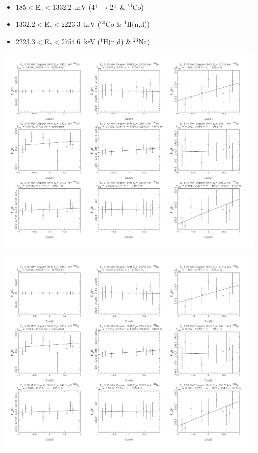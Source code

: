 \begin{itemize}
\item 185$<$E$_\gamma<$1332.2~keV (4$^+\rightarrow$2$^+$ \& $^{60}$Co)
\item 1332.2$<$E$_\gamma<$2223.3~keV ($^{60}$Co \& $^1$H(n,d))
\item 2223.3$<$E$_\gamma<$2754.6~keV ($^1$H(n,d) \& $^{23}$Na)
\end{itemize}
\newpage
\begin{center}
\includegraphics[page=1,angle=90,height=0.95\textheight]{162Dy_ftau_310_LE_n.pdf}
\end{center}
\begin{center}
\includegraphics[page=2,angle=90,height=0.95\textheight]{162Dy_ftau_310_LE_n.pdf}
\end{center}
